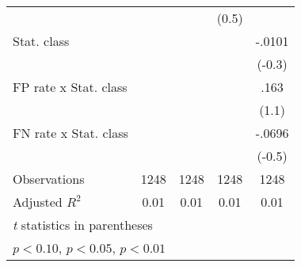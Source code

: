 \begin{table}[htbp]
\begin{tabular}{l*{4}{c}}
                &                  &                  &    (0.5)         &                  \\
Stat. class     &                  &                  &                  &   -.0101         \\
                &                  &                  &                  &   (-0.3)         \\
FP rate x Stat. class&                  &                  &                  &     .163         \\
                &                  &                  &                  &    (1.1)         \\
FN rate x Stat. class&                  &                  &                  &   -.0696         \\
                &                  &                  &                  &   (-0.5)         \\
\hline
Observations    &     1248         &     1248         &     1248         &     1248         \\
Adjusted \(R^{2}\)&     0.01         &     0.01         &     0.01         &     0.01         \\
\hline\hline
\multicolumn{5}{l}{\footnotesize \textit{t} statistics in parentheses}\\
\multicolumn{5}{l}{\footnotesize \sym{*} \(p<0.10\), \sym{**} \(p<0.05\), \sym{***} \(p<0.01\)}\\
\end{tabular}
\end{table}
